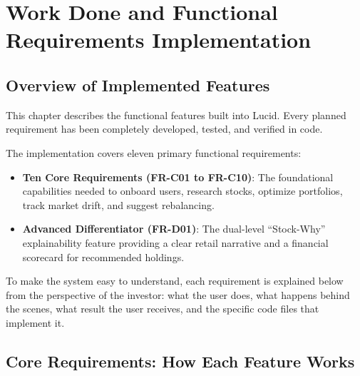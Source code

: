 \chapter{Work Done and Functional Requirements Implementation}

\section{Overview of Implemented Features}
This chapter describes the functional features built into Lucid. Every planned requirement has been completely developed, tested, and verified in code. 

The implementation covers eleven primary functional requirements:
\begin{itemize}
    \item \textbf{Ten Core Requirements (FR-C01 to FR-C10)}: The foundational capabilities needed to onboard users, research stocks, optimize portfolios, track market drift, and suggest rebalancing.
    \item \textbf{Advanced Differentiator (FR-D01)}: The dual-level ``Stock-Why'' explainability feature providing a clear retail narrative and a financial scorecard for recommended holdings.
\end{itemize}

To make the system easy to understand, each requirement is explained below from the perspective of the investor: what the user does, what happens behind the scenes, what result the user receives, and the specific code files that implement it.

\section{Core Requirements: How Each Feature Works}

